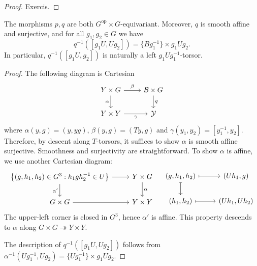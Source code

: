 \documentclass[12pt, a3paper, openany]{book}
\begin{document}
\begin{proof}
    Exercis.
\end{proof}
\begin{Lem}\label{prop:horocycle-fiber}
	The morphisms $p, q$ are both $G^{\mathrm{op}} \times G$-equivariant. Moreover, $q$ is smooth affine and surjective, and for all $g_1, g_2 \in G$ we have 
	\[ q^{-1}\left( [g_1 U, U g_2] \right) = \{B g_1^{-1}\} \times g_1 U g_2 . \]
	In particular, $q^{-1}([g_1 U, g_2])$ is naturally a left $g_1 U g_1^{-1}$-torsor.
\end{Lem}
\begin{proof}
	The following diagram is Cartesian
	\[\begin{tikzcd}
		Y \times G \arrow[r, "\beta"] \arrow[d, "\alpha"'] & \mathcal{B} \times G \arrow[d, "q"] \\
		Y \times Y \arrow[r, "\gamma"'] & \mathcal{Y}
	\end{tikzcd}\]
	where $\alpha(y, g) = (y, y g)$, $\beta(y, g) = (T y, g)$ and $\gamma(y_1, y_2) = [y_1^{-1}, y_2]$. Therefore, by descent along $T$-torsors, it suffices to show $\alpha$ is smooth affine surjective. Smoothness and surjectivity are straightforward. To show $\alpha$ is affine, we use another Cartesian diagram:
	\[\begin{tikzcd}
		\left\{ (g, h_1, h_2) \in G^3: h_1 g h_2^{-1} \in U \right\} \arrow[r] \arrow[d, "{\alpha'}"'] & Y \times G \arrow[d, "\alpha"] \\
		G \times G \arrow[r] & Y \times Y
	\end{tikzcd} \quad \begin{tikzcd}
		(g, h_1, h_2) \arrow[mapsto, r] \arrow[mapsto, d] & (U h_1, g) \\
		(h_1, h_2) \arrow[mapsto, r] & (Uh_1, Uh_2)
	\end{tikzcd}\]
	The upper-left corner is closed in $G^3$, hence $\alpha'$ is affine. This property descends to $\alpha$ along $G \times G \twoheadrightarrow Y \times Y$.
	
	The description of $q^{-1}([g_1 U, U g_2])$ follows from $\alpha^{-1}(U g_1^{-1}, U g_2) = \{U g_1^{-1} \} \times g_1 U g_2$.
\end{proof}
\end{document}
